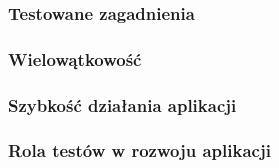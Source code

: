 \subsubsection{Testowane zagadnienia}
\subsubsection{Wielowątkowość}
\subsubsection{Szybkość działania aplikacji}
\subsubsection{Rola testów w rozwoju aplikacji}